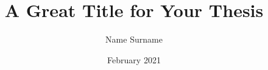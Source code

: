 \documentclass[chaparabic,id,phd,12pt,oneandhalf,fivejury]{metu}
\author{Name Surname}
\title{A Great Title for Your Thesis}
\date{February 2021}
\begin{document}
\begin{preliminaries}


\end{preliminaries}
%   
% 
%
\setlength{\parindent}{0em}
\setlength{\parskip}{10pt}







\appendices






\end{document}
